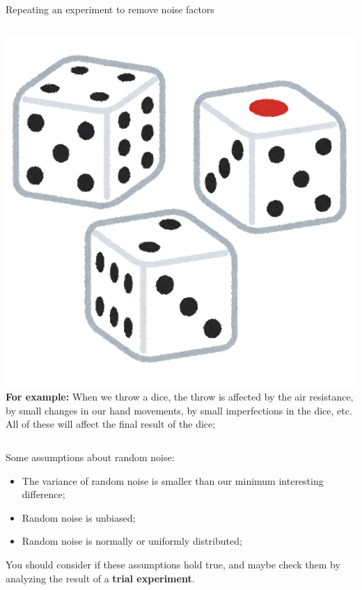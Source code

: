 \begin{frame}{Repeating an experiment to remove noise factors}
  \begin{columns}
    \includegraphics[width=\textwidth]{../img/irasutoya_dice}
     {\bf For example:} When we throw a dice,
    the throw is affected by the air resistance, by small changes in
    our hand movements, by small imperfections in the dice, etc. All
    of these will affect the final result of the dice;
  \end{columns}

  Some assumptions about random noise:
  \begin{itemize}
  \item The variance of random noise is smaller than our minimum interesting difference;
  \item Random noise is unbiased;
  \item Random noise is normally or uniformly distributed;
  \end{itemize}\bigskip

  \begin{block}{}
    You should consider if these assumptions hold true, and maybe
    check them by analyzing the result of a {\bf trial experiment}.
  \end{block}
\end{frame}

